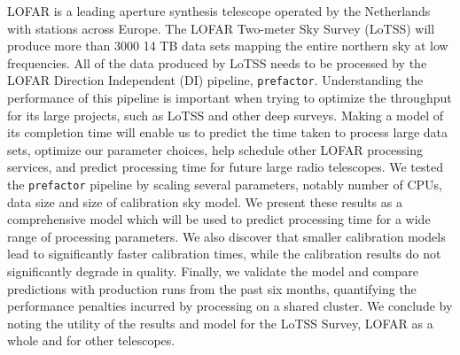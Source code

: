 LOFAR is a leading aperture synthesis telescope operated by the Netherlands with stations across Europe. The LOFAR Two-meter Sky Survey (LoTSS) will produce more than 3000 14 TB data sets mapping the entire northern sky at low frequencies. All of the data produced by LoTSS needs to be processed by the LOFAR Direction Independent (DI) pipeline, \texttt{prefactor}. Understanding the performance of this pipeline is important when trying to optimize the throughput for its large projects, such as LoTSS and other deep surveys. Making a model of its completion time will enable us to predict the time taken to process large data sets, optimize our parameter choices, help schedule other LOFAR processing services, and predict processing time for future large radio telescopes. We tested the \texttt{prefactor} pipeline by scaling several parameters, notably number of CPUs, data size and size of calibration sky model. We present these results as a comprehensive model which will be used to predict processing time for a wide range of processing parameters. We also discover that smaller calibration models lead to significantly faster calibration times, while the calibration results do not significantly degrade in quality. Finally, we validate the model and compare predictions with production runs from the past six months, quantifying the performance penalties incurred by processing on a shared cluster. We conclude by noting the utility of the results and model for the LoTSS Survey, LOFAR as a whole and for other telescopes. 
